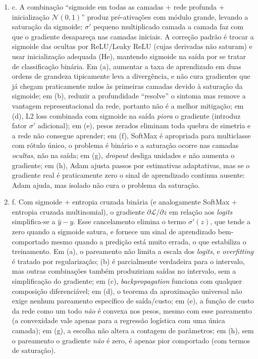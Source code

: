\documentclass{dlproblemset}
\begin{document}
\begin{enumerate}[1)]
    \item c. A combinação ``sigmoide em todas as camadas + rede profunda + inicialização $\mathcal{N}(0, 1)$'' produz pré-ativações com módulo grande, levando a saturação da sigmoide; $\sigma'$ pequeno multiplicado camada a camada faz com que o gradiente desapareça nas camadas iniciais. A correção padrão é trocar a sigmoide das ocultas por ReLU/Leaky ReLU (cujas derivadas não saturam) e usar inicialização adequada (He), mantendo sigmoide na saída por se tratar de classificação binária. Em (a), aumentar a taxa de aprendizado em duas ordens de grandeza tipicamente leva a divergência, e não cura gradientes que já chegam praticamente nulos às primeiras camadas devido à saturação da sigmoide; em (b), reduzir a profundidade ``resolve'' o sintoma mas remove a vantagem representacional da rede, portanto não é a melhor mitigação; em (d), L2 loss combinada com sigmoide na saída \emph{piora} o gradiente (introduz fator $\sigma'$ adicional); em (e), pesos zerados eliminam toda quebra de simetria e a rede não consegue aprender; em (f), SoftMax é apropriada para multiclasse com rótulo único, o problema é binário e a saturação ocorre nas camadas \emph{ocultas}, não na saída; em (g), \textit{dropout} desliga unidades e não aumenta o gradiente; em (h), Adam ajusta passos por estimativas adaptativas, mas se o gradiente real é praticamente zero o sinal de aprendizado continua ausente: Adam ajuda, mas isolado não cura o problema da saturação.

    \item f. Com sigmoide + entropia cruzada binária (e analogamente SoftMax + entropia cruzada multinomial), o gradiente $\partial \mathcal{L}/\partial z$ em relação aos \textit{logits} simplifica-se a $\hat{y} - y$. Esse cancelamento elimina o termo $\sigma'(z)$, que tende a zero quando a sigmoide satura, e fornece um sinal de aprendizado bem-comportado mesmo quando a predição está muito errada, o que estabiliza o treinamento. Em (a), o pareamento não limita a escala dos \textit{logits}, e \textit{overfitting} é tratado por regularização; (b) é parcialmente verdadeira para o intervalo, mas outras combinações também produziriam saídas no intervalo, sem a simplificação do gradiente; em (c), \textit{backpropagation} funciona com qualquer composição diferenciável; em (d), o teorema da aproximação universal não exige nenhum pareamento específico de saída/custo; em (e), a função de custo da rede como um todo \emph{não} é convexa nos pesos, mesmo com esse pareamento (a convexidade vale apenas para a regressão logística com uma única camada); em (g), a escolha não altera a contagem de parâmetros; em (h), sem o pareamento o gradiente \emph{não} é zero, é apenas pior comportado (com termos de saturação).


\end{enumerate}
\end{document}
